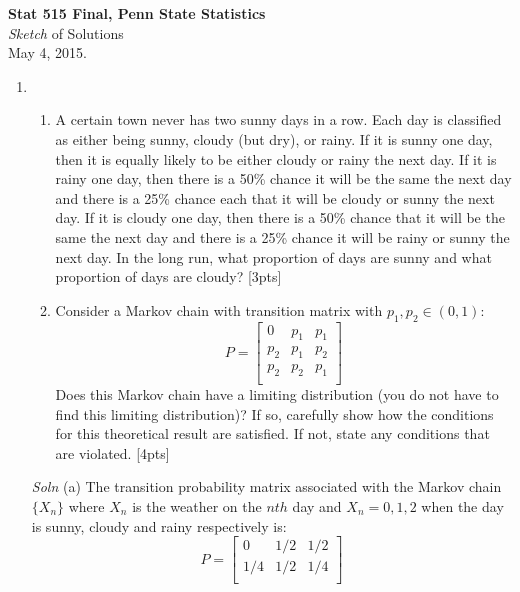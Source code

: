 \documentclass[12pt]{article}
\begin{document}
\begin{center}
{\bf  Stat 515 Final, Penn State Statistics}\\ 
{\it Sketch} of Solutions\\
{May 4, 2015.}
\end{center}

\begin{enumerate}

\item 
\begin{enumerate} 
\item A certain town never has two sunny days in a row. Each
day is classified as either being sunny, cloudy (but dry), or rainy.
If it is sunny one day, then it is equally likely to be either cloudy
or rainy the next day. If it is rainy one day, then there is a 50\%
chance it will be the same the next day and there is a 25\% chance
each that it will be cloudy or sunny the next day. If it is cloudy one
day, then there is a 50\% chance that it will be the same the next day
and there is a 25\% chance it will be rainy or sunny the next day.  In
the long run, what proportion of days are sunny and what proportion of
days are cloudy? [3pts]
\item Consider a Markov chain with transition matrix with $p_1,p_2 \in (0,1)$:
\begin{equation*}
  P=
  \begin{bmatrix}
    0 & p_1 & p_1\\
    p_2 & p_1 & p_2 \\
    p_2 & p_2 & p_1 \\
  \end{bmatrix}
\end{equation*}
Does this Markov chain have a limiting distribution (you do not have
to find this limiting distribution)? If so, carefully show how the conditions for this
theoretical result are satisfied.  If not, state any conditions that
are violated. [4pts]
\end{enumerate}
{\it Soln} (a)
The transition probability matrix associated with the Markov chain
$\{X_n\}$ where $X_n$ is the weather on the $nth$ day and $X_n=0,1,2$
when the day is sunny, cloudy and rainy respectively is:
\begin{equation*}
  P=
  \begin{bmatrix}
    0 & 1/2 & 1/2\\
    1/4 & 1/2 & 1/4 \\

\end{bmatrix}
\end{equation*}
\end{enumerate}
\end{document}
